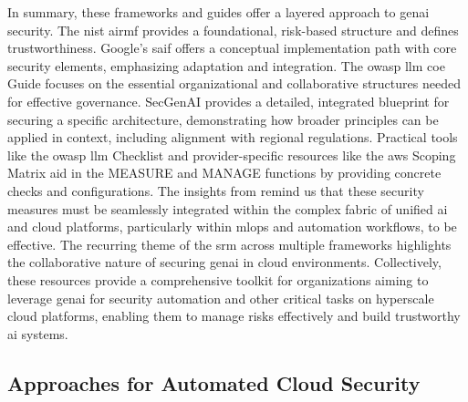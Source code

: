In summary, these frameworks and guides offer a layered approach to \gls{genai} security. The \gls{nist} \gls{airmf} provides a foundational, risk-based structure and defines trustworthiness. Google's \gls{saif} offers a conceptual implementation path with core security elements, emphasizing adaptation and integration. The \gls{owasp} \gls{llm} \gls{coe} Guide focuses on the essential organizational and collaborative structures needed for effective governance. SecGenAI provides a detailed, integrated blueprint for securing a specific architecture, demonstrating how broader principles can be applied in context, including alignment with regional regulations. Practical tools like the \gls{owasp} \gls{llm} Checklist and provider-specific resources like the \gls{aws} Scoping Matrix aid in the MEASURE and MANAGE functions by providing concrete checks and configurations. The insights from \cite{sushil_prabhu_prabhakaran_integration_2024} remind us that these security measures must be seamlessly integrated within the complex fabric of unified \gls{ai} and cloud platforms, particularly within \gls{mlops} and automation workflows, to be effective. The recurring theme of the \gls{srm} across multiple frameworks \cite{tabassi_artificial_2023, hansen_introducing_2023, haryanto_secgenai_2024, editor_llm_nodate} highlights the collaborative nature of securing \gls{genai} in cloud environments. Collectively, these resources provide a comprehensive toolkit for organizations aiming to leverage \gls{genai} for security automation and other critical tasks on \gls{hyperscale} cloud platforms, enabling them to manage risks effectively and build trustworthy \gls{ai} systems.

\subsection{Approaches for Automated Cloud Security} %
\label{sec:Approaches for Automated Cloud Security}


